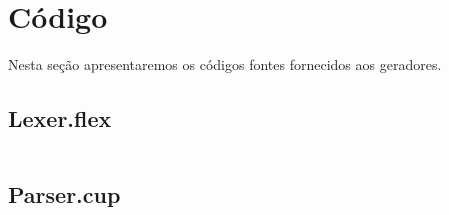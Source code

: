 \section{Código}

Nesta seção apresentaremos os códigos fontes fornecidos aos geradores.

\subsection*{Lexer.flex}
\inputminted[frame=lines,linenos,baselinestretch=1,fontsize=\footnotesize]{java}{code/Lexer.java}

\subsection*{Parser.cup}
\inputminted[frame=lines,linenos,baselinestretch=1,fontsize=\footnotesize]{java}{code/Parser.java}